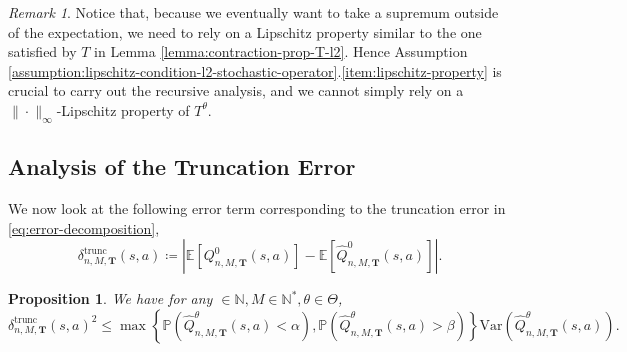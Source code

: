 \documentclass[11pt]{article}
\numberwithin{equation}{section}
\newtheorem{proposition}[theorem]{Proposition}
\theoremstyle{definition}
\theoremstyle{remark}
\newtheorem{remark}{Remark}[section]
\def\N{{\mathbb{N}}}
\begin{document}
\begin{remark}
    
    Notice that, because we eventually want to take a supremum outside of the expectation, we need to rely on a Lipschitz property similar to the one satisfied by $T$ in Lemma \ref{lemma:contraction-prop-T-l2}. Hence Assumption \ref{assumption:lipschitz-condition-l2-stochastic-operator}.\ref{item:lipschitz-property} is crucial to carry out the recursive analysis, and we cannot simply rely on a $\| \cdot \|_{\infty}$-Lipschitz property of $T^\theta$.
\end{remark}
\subsection{Analysis of the Truncation Error}
\label{subsection:analysis-truncation}
We now look at the following error term corresponding to the truncation error in \eqref{eq:error-decomposition},
\begin{equation*}
    \label{eq:truncation-error}
    \delta^{\mathrm{trunc}}_{n,M,\mathbf T}(s,a) \coloneqq \left| \mathbb E \left[ Q ^{0}_{n,M,\mathbf T}(s,a) \right] - \mathbb E \left[ \hat{Q} ^{0}_{n,M,\mathbf T} (s,a) \right] \right|.
\end{equation*}


\begin{proposition}
    \label{proposition:truncation-cauchy-schwarz}
    We have for any $ \in \N, M \in \N^*, \theta \in \Theta$,
    \begin{equation*}
        \label{eq:truncation-upper-bound-cauchy-schwarz}
        \delta^{\mathrm{trunc}}_{n,M,\mathbf T}(s,a)^2 \leq \max\left\{\mathbb P \left(\hat{Q}^\theta_{n,M, \mathbf T}(s,a) < \alpha \right), \mathbb P \left(\hat Q^\theta_{n,M, \mathbf T} (s,a) > \beta \right)\right\} \mathrm{Var}\left(\hat{Q}^\theta_{n,M, \mathbf T}(s,a)\right).
    \end{equation*}
\end{proposition}
\end{document}
